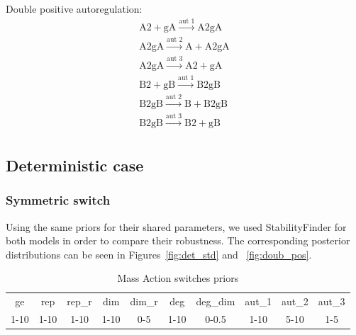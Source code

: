 Double positive autoregulation:
$$
\begin{array}{cccc} 
    \textrm{A2} + \textrm{gA} \stackrel{\textrm{aut 1}}{\longrightarrow} \textrm{A2gA} \\
    \textrm{A2gA} \stackrel{\textrm{aut 2}}{\longrightarrow} \textrm{A} + \textrm{A2gA}\\
    \textrm{A2gA} \stackrel{\textrm{aut 3}}{\longrightarrow} \textrm{A2}+ \textrm{gA}  \\
    \textrm{B2} + \textrm{gB} \stackrel{\textrm{aut 1}}{\longrightarrow} \textrm{B2gB} \\
    \textrm{B2gB} \stackrel{\textrm{aut 2}}{\longrightarrow} \textrm{B} + \textrm{B2gB}\\
    \textrm{B2gB} \stackrel{\textrm{aut 3}}{\longrightarrow} \textrm{B2}+ \textrm{gB}  \\
\end{array}
$$

\subsection{Deterministic case}
\subsubsection{Symmetric switch}
Using the same priors for their shared parameters, we used StabilityFinder for both models in order to compare their robustness. The corresponding posterior distributions can be seen in Figures~\ref{fig:det_std} and ~\ref{fig:doub_pos}.

\begin{table}[p]
\centering
\caption{Mass Action switches priors}
\label{tab:simp}
\begin{tabular}{cccccccccc}
ge   & rep  & rep\_r & dim  & dim\_r & deg & deg\_dim & aut\_1 & aut\_2 & aut\_3\\
1-10 & 1-10 & 1-10    & 1-10 & 0-5    & 1-10 & 0-0.5   &1-10&5-10&1-5
\end{tabular}
\end{table}


